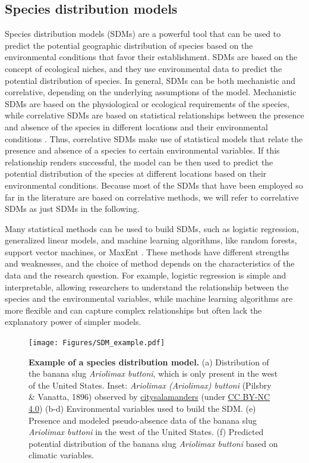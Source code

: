 \subsection{\label{sec:Species distribution models} Species distribution
  models}

Species distribution models (SDMs) are a powerful tool that can be used to
predict the potential geographic distribution of species based on the
environmental conditions that favor their establishment. SDMs are based on
the concept of ecological niches, and they use environmental data to predict
the potential distribution of species. In general, SDMs can be both
mechanistic and correlative, depending on the underlying assumptions of the
model. Mechanistic SDMs are based on the physiological or ecological
requirements of the species, while correlative SDMs are based on statistical
relationships between the presence and absence of the species in different
locations and their environmental conditions \cite{Kearney2009}. Thus,
correlative SDMs make use of statistical models that relate the presence and
absence of a species to certain environmental variables. If this relationship
renders successful, the model can be then used to predict the potential
distribution of the species at different locations based on their environmental
conditions. Because most of the SDMs that have been employed so far in the
literature are based on correlative methods, we will refer to correlative SDMs
as just SDMs in the following.

Many statistical methods can be used to build SDMs, such as logistic
regression, generalized linear models, and machine learning algorithms, like
random forests, support vector machines, or MaxEnt \cite{Franklin2010}. These
methods have different strengths and weaknesses, and the choice of method
depends on the characteristics of the data and the research question. For
example, logistic regression is simple and interpretable, allowing researchers
to understand the relationship between the species and the environmental
variables, while machine learning algorithms are more flexible and can
capture complex relationships but often lack the explanatory power of simpler
models.

\begin{figure}
  \centering
  \texttt{[image: Figures/SDM\_example.pdf]}
  \caption[Example of a species distribution model]{
    \textbf{Example of a species distribution model.} (a) Distribution of
    the banana slug \textit{Ariolimax buttoni}, which is only present in the
    west of the United States. Inset:  \textit{Ariolimax (Ariolimax) buttoni}
    (Pilsbry \& Vanatta, 1896) observed by
    \href{https://www.inaturalist.org/photos/345291902}{citysalamanders}
    (under
    \href{http://creativecommons.org/licenses/by-nc/4.0/}{CC BY-NC 4.0})
    (b-d)
    Environmental variables used to build the SDM. (e) Presence and modeled
    pseudo-absence data of the banana slug \textit{Ariolimax buttoni} in the
    west of the United States. (f) Predicted potential distribution of the
    banana slug \textit{Ariolimax buttoni} based on climatic variables.}
  \label{fig:SDM_example}
\end{figure}

